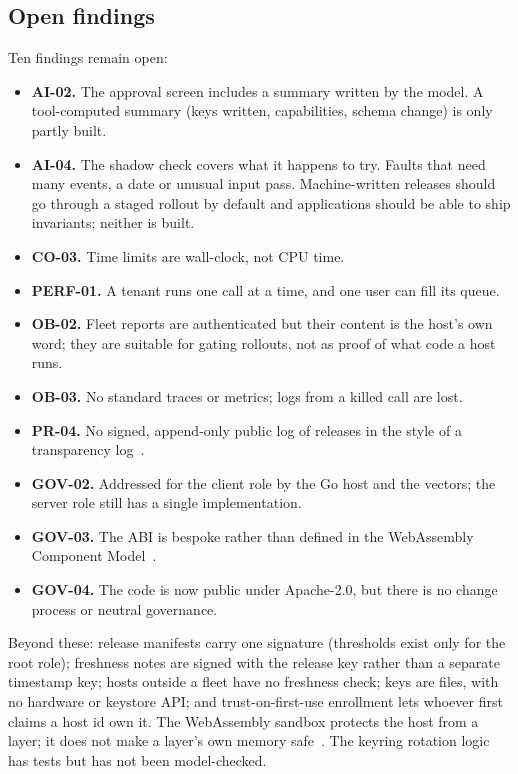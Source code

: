 \documentclass[10pt,twocolumn]{article}
\begin{document}
\subsection{Open findings}

Ten findings remain open:
\begin{itemize}
\item \textbf{AI-02.} The approval screen includes a summary written by the model. A
tool-computed summary (keys written, capabilities, schema change) is only partly built.
\item \textbf{AI-04.} The shadow check covers what it happens to try. Faults that need many
events, a date or unusual input pass. Machine-written releases should go through a staged rollout
by default and applications should be able to ship invariants; neither is built.
\item \textbf{CO-03.} Time limits are wall-clock, not CPU time.
\item \textbf{PERF-01.} A tenant runs one call at a time, and one user can fill its queue.
\item \textbf{OB-02.} Fleet reports are authenticated but their content is the host's own word;
they are suitable for gating rollouts, not as proof of what code a host runs.
\item \textbf{OB-03.} No standard traces or metrics; logs from a killed call are lost.
\item \textbf{PR-04.} No signed, append-only public log of releases in the style of a
transparency log~\cite{newman2022sigstore}.
\item \textbf{GOV-02.} Addressed for the client role by the Go host and the vectors; the server
role still has a single implementation.
\item \textbf{GOV-03.} The ABI is bespoke rather than defined in the WebAssembly Component
Model~\cite{componentmodel}.
\item \textbf{GOV-04.} The code is now public under Apache-2.0, but there is no change process or
neutral governance.
\end{itemize}

Beyond these: release manifests carry one signature (thresholds exist only for the root role);
freshness notes are signed with the release key rather than a separate timestamp key; hosts
outside a fleet have no freshness check; keys are files, with no hardware or keystore API; and
trust-on-first-use enrollment lets whoever first claims a host id own it. The WebAssembly sandbox
protects the host from a layer; it does not make a layer's own memory safe~\cite{lehmann2020wasm}.
The keyring rotation logic has tests but has not been model-checked.
\end{document}
